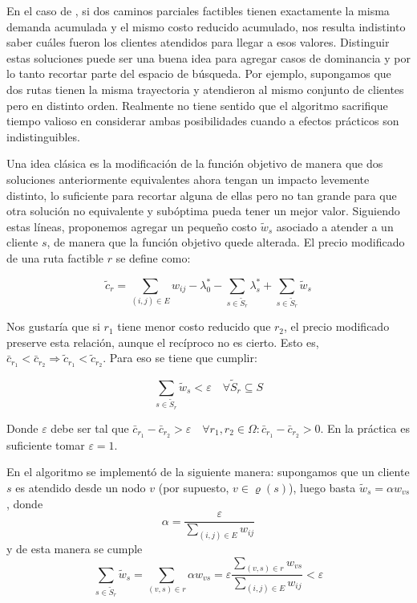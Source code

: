 En el caso de , si dos caminos parciales factibles tienen exactamente la misma demanda acumulada y el mismo costo reducido acumulado, nos resulta indistinto saber cuáles fueron los clientes atendidos para llegar a esos valores. Distinguir estas soluciones puede ser una buena idea para agregar casos de dominancia y por lo tanto recortar parte del espacio de búsqueda. Por ejemplo, supongamos que dos rutas tienen la misma trayectoria y atendieron al mismo conjunto de clientes pero en distinto orden. Realmente no tiene sentido que el algoritmo sacrifique tiempo valioso en considerar ambas posibilidades cuando a efectos prácticos son indistinguibles. 

Una idea clásica es la modificación de la función objetivo de manera que dos soluciones anteriormente equivalentes ahora tengan un impacto levemente distinto, lo suficiente para recortar alguna de ellas pero no tan grande para que otra solución no equivalente y subóptima pueda tener un mejor valor. Siguiendo estas líneas, proponemos agregar un pequeño costo $\tilde{w}_s$ asociado a atender a un cliente $s$, de manera que la función objetivo quede alterada. El precio modificado de una ruta factible $r$ se define como:

\begin{equation}
    \tilde{c}_r = \sum_{(i, j) \in E}{w_{ij}} - \lambda^*_0 - \sum_{s \in \tilde{S}_r}{\lambda^*_s} + \sum_{s \in \tilde{S}_r}{\tilde{w}_s}
\end{equation}

Nos gustaría que si $r_1$ tiene menor costo reducido que $r_2$, el precio modificado preserve esta relación, aunque el recíproco no es cierto. Esto es, $\bar{c}_{r_1} < \bar{c}_{r_2} \Rightarrow \tilde{c}_{r_1} < \tilde{c}_{r_2}$. Para eso se tiene que cumplir:

\begin{equation}
    \sum_{s \in \tilde{S}_r}{\tilde{w}_s} < \varepsilon \quad \forall \tilde{S}_r \subseteq S
\end{equation}

Donde $\varepsilon$ debe ser tal que $\bar{c}_{r_1} - \bar{c}_{r_2} > \varepsilon \quad \forall r_1, r_2 \in \Omega : \bar{c}_{r_1} - \bar{c}_{r_2} > 0$. En la práctica es suficiente tomar $\varepsilon = 1$.

En el algoritmo se implementó de la siguiente manera: supongamos que un cliente $s$ es atendido desde un nodo $v$ (por supuesto, $v \in \varrho(s)$), luego basta $\tilde{w}_s = \alpha w_{vs}$, donde
\begin{equation}
    \alpha = \frac{\varepsilon}{\sum_{(i,j) \in E}{w_{ij}}}
\end{equation}
y de esta manera se cumple
\begin{equation}
    \sum_{s \in \tilde{S}_r}{\tilde{w}_s} = 
    \sum_{(v, s) \in r}{\alpha w_{vs}} = 
    \varepsilon \frac{\sum_{(v, s) \in r}{w_{vs}}}{\sum_{(i,j) \in E}{w_{ij}}} < 
    \varepsilon
\end{equation}

